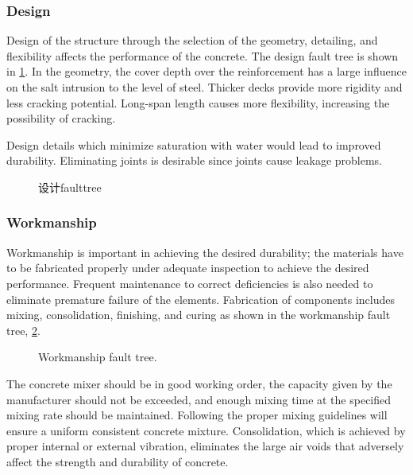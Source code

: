 \subsubsection{Design}
Design of the structure through the selection of the geometry, detailing, and flexibility affects the performance of the concrete. The design fault tree is shown in \cref{fig:faulttree-design}. In the geometry, the cover depth over the reinforcement has a large influence on the salt intrusion to the level of steel. Thicker decks provide more rigidity and less cracking potential. Long-span length causes more flexibility, increasing the possibility of cracking.

Design details which minimize saturation with water would lead to improved durability. Eliminating joints is desirable since joints cause leakage problems.

\begin{figure}
  \caption{设计\gls*{faulttree}}
  \label{fig:faulttree-design}
\end{figure}

\subsubsection{Workmanship}
Workmanship is important in achieving the desired durability; the materials have to be fabricated properly under
adequate inspection to achieve the desired performance. Frequent maintenance to correct deficiencies is also needed
to eliminate premature failure of the elements. Fabrication of components includes mixing, consolidation, finishing,
and curing as shown in the workmanship fault tree, \cref{fig:fault-tree-workmanship}.

\begin{figure}
  \caption{Workmanship fault tree.}
  \label{fig:fault-tree-workmanship}
\end{figure}

The concrete mixer should be in good working order, the capacity given by the manufacturer should not be exceeded, and enough mixing time at the specified mixing rate should be maintained. Following the proper mixing guidelines will ensure a uniform consistent concrete mixture. Consolidation, which is achieved by proper internal or external vibration, eliminates the large air voids that adversely affect the strength and durability of concrete.

